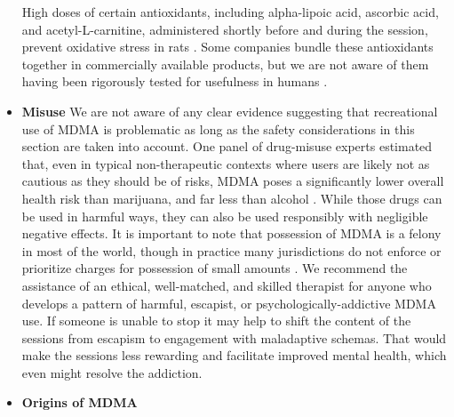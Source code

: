 \documentclass[12pt,letterpaper]{book}
\begin{document}
\begin{itemize}
        High doses of certain antioxidants, including alpha-lipoic acid, ascorbic acid, and acetyl-L-carnitine, administered shortly before and during the session, prevent oxidative stress in rats \cite{aguirre1999alpha,shankaran2001ascorbic,alves2009acetyl}. Some companies bundle these antioxidants together in commercially available products, but we are not aware of them having been rigorously tested for usefulness in humans \cite{rollKit}.
    \item \textbf{Misuse}
        We are not aware of any clear evidence suggesting that recreational use of MDMA is problematic as long as the safety considerations in this section are taken into account. One panel of drug-misuse experts estimated that, even in typical non-therapeutic contexts where users are likely not as cautious as they should be of risks, MDMA poses a significantly lower overall health risk than marijuana, and far less than alcohol \cite{nuttDrugHarms}. While those drugs can be used in harmful ways, they can also be used responsibly with negligible negative effects. It is important to note that possession of MDMA is a felony in most of the world, though in practice many jurisdictions do not enforce or prioritize charges for possession of small amounts \cite{alphaLegalization}. We recommend the assistance of an ethical, well-matched, and skilled therapist for anyone who develops a pattern of harmful, escapist, or psychologically-addictive MDMA use. If someone is unable to stop it may help to shift the content of the sessions from escapism to engagement with maladaptive schemas. That would make the sessions less rewarding and facilitate improved mental health, which even might resolve the addiction.
    \item \textbf{Origins of MDMA}

\end{itemize}
\end{document}
